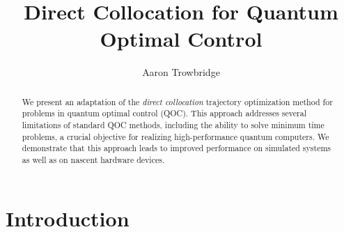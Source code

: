 \documentclass{article}
\title{
  Direct Collocation for Quantum Optimal Control 
}
\author{Aaron Trowbridge}
\date{}
\begin{document}
\maketitle


\begin{abstract}
  We present an adaptation of the \textit{direct collocation} trajectory optimization method for problems in quantum optimal control (QOC).  This approach addresses several limitations of standard QOC methods, including the ability to solve minimum time problems, a crucial objective for realizing high-performance quantum computers.  We demonstrate that this approach leads to improved performance on simulated systems as well as on nascent hardware devices.  
\end{abstract}

\tableofcontents

\newpage


\section{Introduction}
\end{document}

